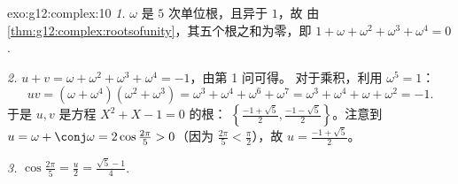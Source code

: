 \begin{solution}{exo:g12:complex:10}
\emph{1.} $\omega$ 是 $5$ 次单位根，且异于 $1$，故
由\cref{thm:g12:complex:rootsofunity}，其五个根之和为零，即
$1 + \omega + \omega^2 + \omega^3 + \omega^4 = 0$.

\emph{2.} $u + v = \omega + \omega^2 + \omega^3 + \omega^4 = -1$，由第 1 问可得。
对于乘积，利用 $\omega^5 = 1$：
\[
uv = (\omega + \omega^4)(\omega^2 + \omega^3)
= \omega^3 + \omega^4 + \omega^6 + \omega^7
= \omega^3 + \omega^4 + \omega + \omega^2 = -1 .
\]
于是 $u, v$ 是方程 $X^2 + X - 1 = 0$ 的根：
$\left\{\frac{-1+\sqrt5}{2}, \frac{-1-\sqrt5}{2}\right\}$。注意到
$u = \omega + \conj\omega = 2\cos\frac{2\pi}{5} > 0$（因为
$\frac{2\pi}{5} < \frac{\pi}{2}$），故 $u = \frac{-1 + \sqrt5}{2}$。

\emph{3.} $\cos\frac{2\pi}{5} = \frac u2 = \frac{\sqrt5 - 1}{4}$.
\end{solution}

